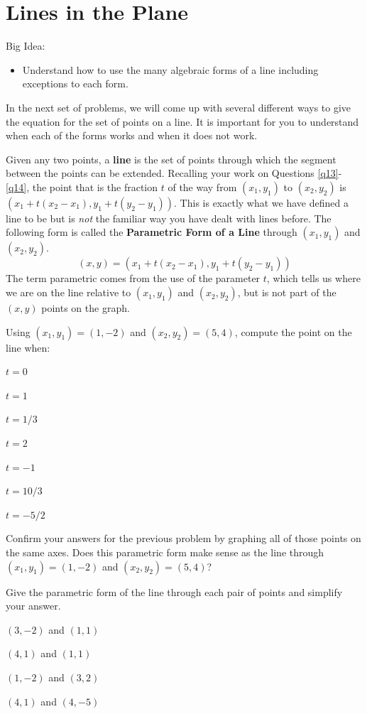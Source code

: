 \section{Lines in the Plane}
Big Idea:
\begin{itemize}
\item Understand how to use the many algebraic forms of a line including exceptions to each form.
\end{itemize}
In the next set of problems, we will come up with several different ways to give the equation for the set of points on a line. It is important for you to understand when each of the forms works and when it does not work.
\begin{info} Given any two points, a \textbf{line} is the set of points through which the segment between the points can be extended.
Recalling your work on Questions \ref{q13}-\ref{q14}, the point that is the fraction $t$ of the way from $(x_1,y_1)$ to $(x_2,y_2)$ is $(x_1+t(x_2-x_1),y_1+t(y_2-y_1))$. This is exactly what we have defined a line to be but is \emph{not} the familiar way you have dealt with lines before. The following form is called the \textbf{Parametric Form of a Line} through $(x_1,y_1)$ and $(x_2,y_2)$. $$(x,y)=(x_1+t(x_2-x_1),y_1+t(y_2-y_1))$$
The term parametric comes from the use of the parameter $t$, which tells us where we are on the line relative to $(x_1,y_1)$ and $(x_2,y_2)$, but is not part of the $(x,y)$ points on the graph.
\end{info}

\bq\label{qp} Using $(x_1,y_1)=(1,-2)$ and $(x_2,y_2) = (5,4)$, compute the point on the line when:
\be
\item $t=0$
\item $t=1$
\item $t=1/3$
\item $t=2$
\item $t=-1$
\item $t=10/3$
\item $t=-5/2$
\ee
\eq

\bq Confirm your answers for the previous problem by graphing all of those points on the same axes. Does this parametric form make sense as the line through $(x_1,y_1)=(1,-2)$ and $(x_2,y_2) = (5,4)$?
\eq

\bq Give the parametric form of the line through each pair of points and simplify your answer.
\be
\item $(3,-2)$ and $(1,1)$
\item $(4,1)$ and $(1,1)$
\item $(1,-2)$ and $(3,2)$
\item $(4,1)$ and $(4,-5)$
\ee
\eq

